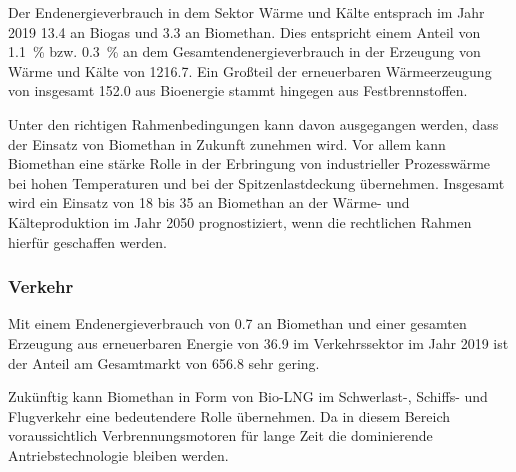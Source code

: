 Der Endenergieverbrauch in dem Sektor Wärme und Kälte entsprach im Jahr 2019 \SI{13.4}{\twh} an Biogas und \SI{3.3}{\twh} an Biomethan. Dies entspricht einem Anteil von \SI{1.1}{\percent} bzw. \SI{0.3}{\percent} an dem Gesamtendenergieverbrauch in der Erzeugung von Wärme und Kälte von \SI{1216.7}{\twh}. Ein Großteil der erneuerbaren Wärmeerzeugung von insgesamt \SI{152.0}{\twh} aus Bioenergie stammt hingegen aus Festbrennstoffen. \parencite{BWE2020}\smallskip

Unter den richtigen Rahmenbedingungen kann davon ausgegangen werden, dass der Einsatz von Biomethan in Zukunft zunehmen wird. Vor allem kann Biomethan eine stärke Rolle in der Erbringung von industrieller Prozesswärme bei hohen Temperaturen und bei der Spitzenlastdeckung übernehmen. Insgesamt wird ein Einsatz von \SI{18}{\twh} bis \SI{35}{\twh} an Biomethan an der Wärme- und Kälteproduktion im Jahr 2050 prognostiziert, wenn die rechtlichen Rahmen hierfür geschaffen werden. \parencite{dena2017}


\subsubsection{Verkehr}

Mit einem Endenergieverbrauch von \SI{0.7}{\twh} an Biomethan und einer gesamten Erzeugung aus erneuerbaren Energie von \SI{36.9}{\twh} im Verkehrssektor im Jahr 2019 ist der Anteil am Gesamtmarkt von \SI{656.8}{\twh} sehr gering. \parencite{BWE2020} \smallskip

Zukünftig kann Biomethan in Form von Bio-\gls{LNG} im Schwerlast-, Schiffs- und Flugverkehr eine bedeutendere Rolle übernehmen. Da in diesem Bereich voraussichtlich Verbrennungsmotoren für lange Zeit die dominierende Antriebstechnologie bleiben werden. \parencite{dena2017}